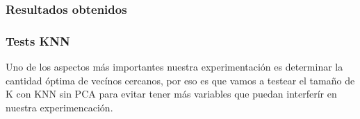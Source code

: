 \subsubsection*{Resultados obtenidos}

\subsubsection*{Tests KNN}

Uno de los aspectos más importantes nuestra experimentación es determinar la cantidad óptima de vecínos cercanos, por eso es que vamos a testear el tamaño de K con KNN sin PCA para evitar tener más variables que puedan interferír en nuestra experimencación.




